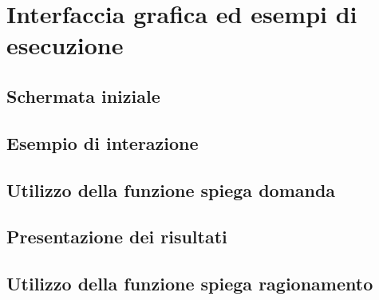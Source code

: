 \section{Interfaccia grafica ed esempi di esecuzione}

\subsection{Schermata iniziale}

\subsection{Esempio di interazione}

\subsection{Utilizzo della funzione spiega domanda}

\subsection{Presentazione dei risultati}

\subsection{Utilizzo della funzione spiega ragionamento}